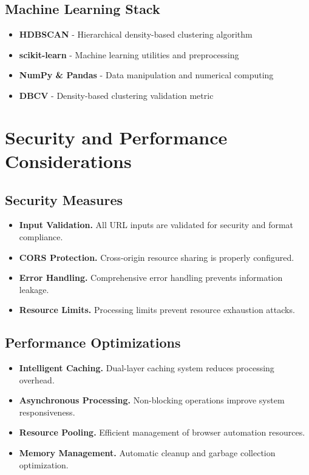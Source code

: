 \subsection{Machine Learning Stack}

\begin{itemize}
\item \textbf{HDBSCAN} - Hierarchical density-based clustering algorithm
\item \textbf{scikit-learn} - Machine learning utilities and preprocessing
\item \textbf{NumPy \& Pandas} - Data manipulation and numerical computing
\item \textbf{DBCV} - Density-based clustering validation metric
\end{itemize}

\section{Security and Performance Considerations}
\label{sec:security_performance}

\subsection{Security Measures}

\begin{itemize}
\item \textbf{Input Validation.} All URL inputs are validated for security and format compliance.
\item \textbf{CORS Protection.} Cross-origin resource sharing is properly configured.
\item \textbf{Error Handling.} Comprehensive error handling prevents information leakage.
\item \textbf{Resource Limits.} Processing limits prevent resource exhaustion attacks.
\end{itemize}

\subsection{Performance Optimizations}

\begin{itemize}
\item \textbf{Intelligent Caching.} Dual-layer caching system reduces processing overhead.
\item \textbf{Asynchronous Processing.} Non-blocking operations improve system responsiveness.
\item \textbf{Resource Pooling.} Efficient management of browser automation resources.
\item \textbf{Memory Management.} Automatic cleanup and garbage collection optimization.
\end{itemize} 